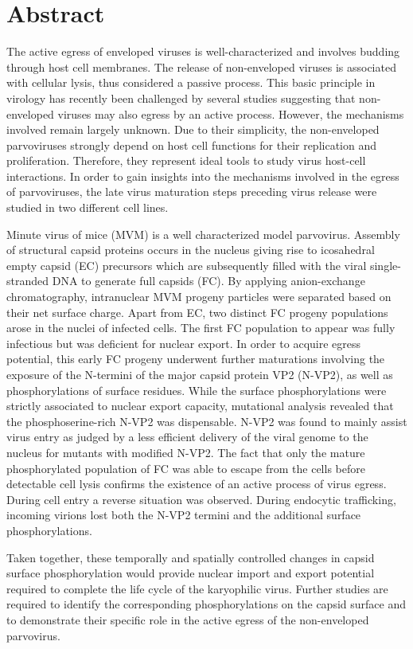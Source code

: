 

\chapter*{Abstract}

\label{Abstract} %


The active egress of enveloped viruses is well-characterized and involves budding through host cell membranes. The release of non-enveloped viruses is associated with cellular lysis, thus considered a passive process. This basic principle in virology has recently been challenged by several studies suggesting that non-enveloped viruses may also egress by an active process. However, the mechanisms involved remain largely unknown. Due to their simplicity, the non-enveloped parvoviruses strongly depend on host cell functions for their replication and proliferation. Therefore, they represent ideal tools to study virus host-cell interactions. In order to gain insights into the mechanisms involved in the egress of parvoviruses, the late virus maturation steps preceding virus release were studied in two different cell lines. 
	
\par
\medskip
Minute virus of mice (MVM) is a well characterized model parvovirus. Assembly of structural capsid proteins occurs in the nucleus giving rise to icosahedral empty capsid (EC) precursors which are subsequently filled with the viral single-stranded DNA to generate full capsids (FC). By applying anion-exchange chromatography, intranuclear MVM progeny particles were separated based on their net surface charge. Apart from EC, two distinct FC progeny populations arose in the nuclei of infected cells. The first FC population to appear was fully infectious but was deficient for nuclear export. In order to acquire egress potential, this early FC progeny underwent further maturations involving the exposure of the N-termini of the major capsid protein VP2 (N-VP2), as well as phosphorylations of surface residues. While the surface phosphorylations were strictly associated to nuclear export capacity, mutational analysis revealed that the phosphoserine-rich N-VP2 was dispensable. N-VP2 was found to mainly assist virus entry as judged by a less efficient delivery of the viral genome to the nucleus for mutants with modified N-VP2. The fact that only the mature phosphorylated population of FC was able to escape from the cells before detectable cell lysis confirms the existence of an active process of virus egress. During cell entry a reverse situation was observed. During endocytic trafficking, incoming virions lost both the N-VP2 termini and the additional surface phosphorylations. 
	
\par
\medskip
Taken together, these temporally and spatially controlled changes in capsid surface phosphorylation would provide nuclear import and export potential required to complete the life cycle of the karyophilic virus. Further studies are required to identify the corresponding phosphorylations on the capsid surface and to demonstrate their specific role in the active egress of the non-enveloped parvovirus. 